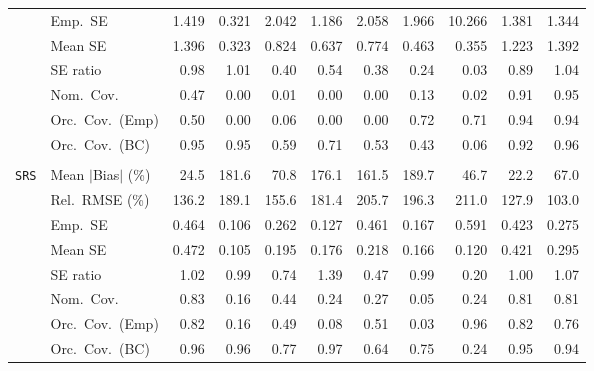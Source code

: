 \begin{landscape}
\begin{longtable}{llrrrrrrrrr}
 & Emp.\ SE & 1.419 & 0.321 & 2.042 & 1.186 & 2.058 & 1.966 & 10.266 & 1.381 & 1.344 \\
 & Mean SE & 1.396 & 0.323 & 0.824 & 0.637 & 0.774 & 0.463 & 0.355 & 1.223 & 1.392 \\
 & SE ratio & \cellcolor{ranktwo}0.98 & \cellcolor{rankone}1.01 & 0.40 & 0.54 & 0.38 & 0.24 & 0.03 & 0.89 & \cellcolor{rankthree}1.04 \\
 & Nom.\ Cov. & \cellcolor{rankthree}0.47 & 0.00 & 0.01 & 0.00 & 0.00 & 0.13 & 0.02 & \cellcolor{ranktwo}0.91 & \cellcolor{rankone}0.95 \\
 & Orc.\ Cov.\ (Emp) & 0.50 & 0.00 & 0.06 & 0.00 & 0.00 & \cellcolor{ranktwo}0.72 & \cellcolor{rankthree}0.71 & \cellcolor{rankone}0.94 & \cellcolor{rankone}0.94 \\
 & Orc.\ Cov.\ (BC) & \cellcolor{rankone}0.95 & \cellcolor{rankone}0.95 & 0.59 & 0.71 & 0.53 & 0.43 & 0.06 & \cellcolor{rankthree}0.92 & \cellcolor{ranktwo}0.96 \\
\addlinespace[2pt]
\multicolumn{11}{l}{\textbf{Continuous Phase-One Covariates}} \\
\addlinespace[2pt]
\quad \texttt{SRS} & Mean $|$Bias$|$ (\%) & \cellcolor{ranktwo}24.5 & 181.6 & 70.8 & 176.1 & 161.5 & 189.7 & \cellcolor{rankthree}46.7 & \cellcolor{rankone}22.2 & 67.0 \\
 & Rel.\ RMSE (\%) & \cellcolor{rankthree}136.2 & 189.1 & 155.6 & 181.4 & 205.7 & 196.3 & 211.0 & \cellcolor{ranktwo}127.9 & \cellcolor{rankone}103.0 \\
 & Emp.\ SE & 0.464 & 0.106 & 0.262 & 0.127 & 0.461 & 0.167 & 0.591 & 0.423 & 0.275 \\
 & Mean SE & 0.472 & 0.105 & 0.195 & 0.176 & 0.218 & 0.166 & 0.120 & 0.421 & 0.295 \\
 & SE ratio & \cellcolor{rankthree}1.02 & \cellcolor{ranktwo}0.99 & 0.74 & 1.39 & 0.47 & \cellcolor{ranktwo}0.99 & 0.20 & \cellcolor{rankone}1.00 & 1.07 \\
 & Nom.\ Cov. & \cellcolor{rankone}0.83 & 0.16 & \cellcolor{rankthree}0.44 & 0.24 & 0.27 & 0.05 & 0.24 & \cellcolor{ranktwo}0.81 & \cellcolor{ranktwo}0.81 \\
 & Orc.\ Cov.\ (Emp) & \cellcolor{ranktwo}0.82 & 0.16 & 0.49 & 0.08 & 0.51 & 0.03 & \cellcolor{rankone}0.96 & \cellcolor{ranktwo}0.82 & \cellcolor{rankthree}0.76 \\
 & Orc.\ Cov.\ (BC) & \cellcolor{ranktwo}0.96 & \cellcolor{ranktwo}0.96 & 0.77 & \cellcolor{rankthree}0.97 & 0.64 & 0.75 & 0.24 & \cellcolor{rankone}0.95 & \cellcolor{ranktwo}0.94 \\

\end{longtable}
\end{landscape}
